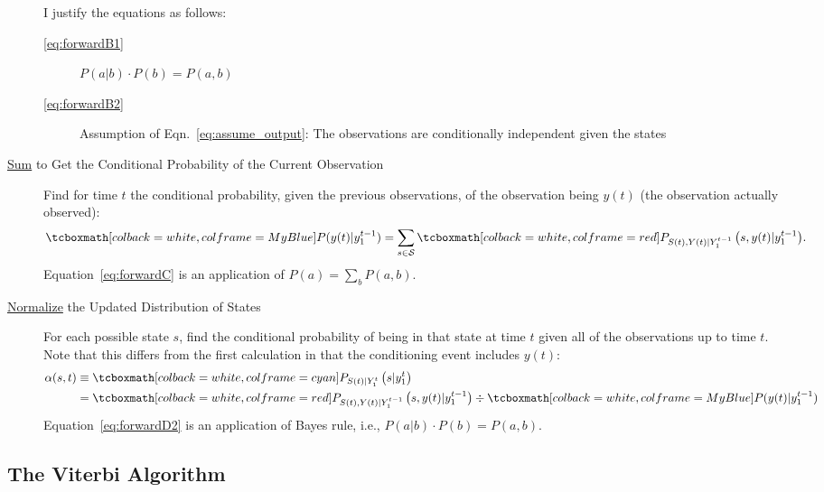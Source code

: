 \documentclass[]{article}
\newcommand{\ti}[2]{{#1}{(#2)}}                  %
\newcommand{\states}{{\cal{S}}}
\newcommand{\ie}{i.e.\xspace}
\begin{document}
\begin{description}
\begin{subequations}
  \end{subequations}
I justify the equations as follows:
\begin{description}
\item[\eqref{eq:forwardB1}]  $P(a|b)\cdot P(b) = P(a,b)$
\item[\eqref{eq:forwardB2}] Assumption of
  Eqn.~\eqref{eq:assume_output}: The observations are conditionally
  independent given the states
\end{description}
\item[\underline{Sum} to Get the Conditional Probability of the Current Observation]
  Find for time $t$ the conditional probability, given the previous
  observations, of the observation being $\ti{y}{t}$ (the observation actually
  observed):
  \begin{align}
    \label{eq:forwardC}
    \gammax &= \sum_{s \in \states} \pregamma .
  \end{align}
Equation~\eqref{eq:forwardC} is an application of $P(a) = \sum_b P(a,b)$.
\item[\underline{Normalize} the Updated Distribution of States] For each possible
  state $s$, find the conditional probability of being in that state
  at time $t$ given all of the observations up to time $t$.  Note that
  this differs from the first calculation in that the
  conditioning event includes $\ti{y}{t}$:%
  \begin{subequations}\label{eq:forwardD}
    \begin{align}
      \label{eq:forwardD1}
      \alpha(s,t) &\equiv
      \alphax{t}{s} \\
      \label{eq:forwardD2}
      &= \pregamma \div \gammax
    \end{align}
  \end{subequations}
  Equation~\eqref{eq:forwardD2} is an application of Bayes rule, \ie,
  $P(a|b)\cdot P(b) = P(a,b)$.
\end{description}

\subsection{The Viterbi Algorithm}\label{sec:viterbi}
\end{document}
